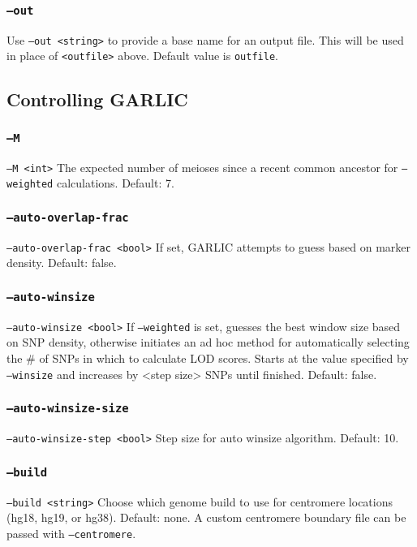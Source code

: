 \documentclass[12pt]{article}%
\begin{document}
\subsubsection{{\tt --out}}

Use {\tt --out <string>} to provide a base name for an output file.  This will be used in place of {\tt <outfile>} above.  Default value is {\tt outfile}.  

\subsection{Controlling GARLIC}

\subsubsection{{\tt --M}}
{\tt --M <int>} The expected number of meioses since a recent common ancestor for {\tt --weighted} calculations. Default: 7.

\subsubsection{{\tt --auto-overlap-frac}}
{\tt --auto-overlap-frac <bool>} If set, GARLIC attempts to guess based on marker density. Default: false.

\subsubsection{{\tt --auto-winsize}}

{\tt --auto-winsize <bool>} If {\tt --weighted} is set, guesses the best window size based on SNP density, otherwise initiates an ad hoc method for automatically selecting the \# of SNPs in which to calculate LOD scores. Starts at the value specified by {\tt --winsize} and increases by <step size> SNPs until finished. Default: false.

\subsubsection{{\tt --auto-winsize-size}}
{\tt --auto-winsize-step <bool>} Step size for auto winsize algorithm. Default: 10.

\subsubsection{{\tt --build}}

{\tt --build <string>} Choose which genome build to use for centromere locations (hg18, hg19, or hg38). Default: none. A custom centromere boundary file can be passed with {\tt --centromere}.
\end{document}
